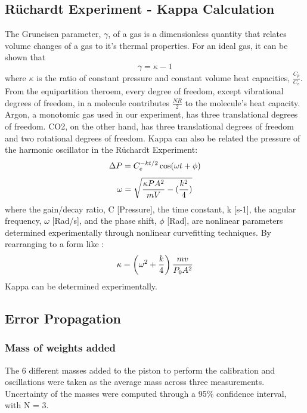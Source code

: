 \documentclass[lettersize,journal]{IEEEtran}
\begin{document}
	\subsection{Rüchardt Experiment - Kappa Calculation}
	The Gruneisen parameter, $\gamma$, of a gas is a dimensionless quantity that relates volume changes of a gas to it's thermal properties. For an ideal gas, it can be shown that
	\begin{equation}
		\label{deqn_ex3}
		\gamma = \kappa - 1
	\end{equation}
	where $\kappa$ is the ratio of constant pressure and constant volume heat capacities, \( \frac{C_p}{C_v} \).
	From the equipartition theroem, every degree of freedom, except vibrational degrees of freedom, in a molecule contributes \( \frac{NR}{2} \) to the molecule's heat capacity. Argon, a monotomic gas used in our experiment, has three translational degrees of freedom. CO2, on the other hand, has three translational degrees of freedom and two rotational degrees of freedom.
	Kappa can also be related the pressure of the harmonic oscillator in the Rüchardt Experiment:
	\begin{equation}
		\label{deqn_ex4}
		\Delta P = C_e^{-kt/2}\cos(\omega t + \phi) \\
	\end{equation}
	\begin{equation}
		\label{deqn_ex5}
		\omega = \sqrt{\frac{\kappa P A^2 }{mV}-(\frac{k^2}{4})} \\
	\end{equation}
	where the gain/decay ratio, C [Pressure], the time constant, k [s-1], the angular frequency, $\omega$ [Rad/s], and the phase shift, $\phi$ [Rad], are nonlinear parameters determined experimentally through nonlinear curvefitting techniques. By rearranging to a form like : 
	\begin{equation}
		\label{deqn_ex5.5}
		\kappa = \left(\omega^2 + \frac{k}{4}\right) \frac{m v}{P_0 A^2} \\
	\end{equation}
	Kappa can be determined experimentally.
	
	\subsection{Error Propagation}
	\subsubsection{Mass of weights added}
	The 6 different masses added to the piston to perform the calibration and oscillations were taken as the average mass across three measurements. Uncertainty of the masses were computed through a 95\% confidence interval, with N = 3.
\end{document}
